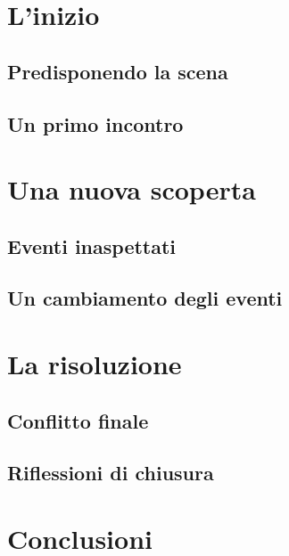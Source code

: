 \documentclass[12pt,a4paper]{report}
\begin{document}
\begin{abstract}
\lipsum[1-3]
\end{abstract}

\pagestyle{fancy}
\tableofcontents
\clearpage

\pagestyle{fancy}
\newpage
{}

\chapter{L'inizio}

\section{Predisponendo la scena}
\lipsum[1-2] %
\section{Un primo incontro}
\lipsum[3-4]

\chapter{Una nuova scoperta}

\section{Eventi inaspettati}
\lipsum[5-6]
\section{Un cambiamento degli eventi}
\lipsum[7-8]

\chapter{La risoluzione}

\section{Conflitto finale}
\lipsum[9-10]
\section{Riflessioni di chiusura}
\lipsum[11-12]

\appendix

\chapter{Conclusioni}
\lipsum[13]
\end{document}
